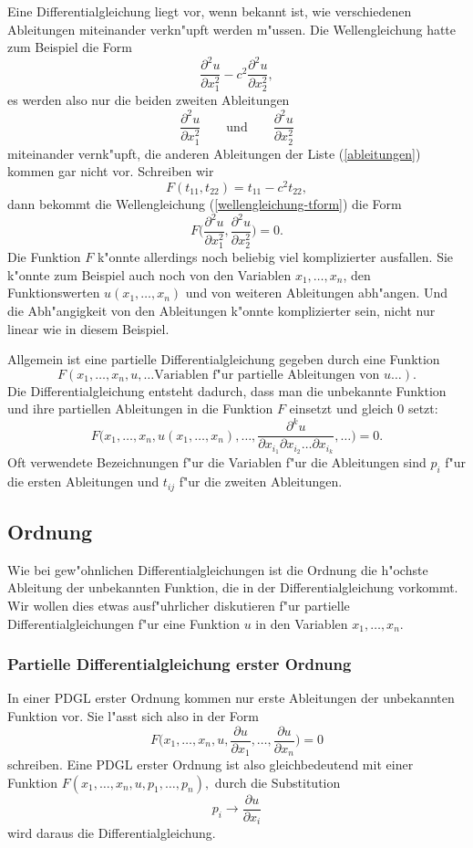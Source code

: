 Eine Differentialgleichung liegt vor, wenn bekannt ist, wie verschiedenen
Ableitungen miteinander verkn"upft werden m"ussen.
Die Wellengleichung hatte zum Beispiel die Form
\begin{equation}
\frac{\partial^2 u}{\partial x_1^2}
-
c^2\frac{\partial^2 u}{\partial x_2^2},
\label{wellengleichung-tform}
\end{equation}
es werden also nur die beiden zweiten Ableitungen
\[
\frac{\partial^2 u}{\partial x_1^2}
\qquad
\text{und}
\qquad
\frac{\partial^2 u}{\partial x_2^2}
\]
miteinander vernk"upft, die anderen Ableitungen der Liste
(\ref{ableitungen}) kommen gar nicht vor.
Schreiben wir
\[
F(t_{11}, t_{22}) = t_{11} -c^2t_{22},
\]
dann bekommt die Wellengleichung (\ref{wellengleichung-tform})
die Form
\[
F\biggl(
\frac{\partial^2 u}{\partial x_1^2},
\frac{\partial^2 u}{\partial x_2^2}
\biggr)=0.
\]
Die Funktion $F$ k"onnte allerdings noch beliebig viel komplizierter
ausfallen.
Sie k"onnte zum Beispiel auch noch von den Variablen $x_1,\dots,x_n$,
den Funktionswerten $u(x_1,\dots,x_n)$ und von weiteren Ableitungen
abh"angen.
Und die Abh"angigkeit von den Ableitungen k"onnte komplizierter sein,
nicht nur linear wie in diesem Beispiel.

Allgemein ist eine partielle Differentialgleichung gegeben
durch eine Funktion
\[
F(x_1,\dots,x_n,u,\dots\text{Variablen f"ur partielle Ableitungen von $u$}\dots).
\]
Die Differentialgleichung
entsteht dadurch, dass man die unbekannte Funktion
und ihre partiellen Ableitungen in die Funktion $F$ einsetzt und
gleich $0$ setzt:
\[
F\biggl(x_1,\dots,x_n,u(x_1,\dots,x_n),\dots,
\frac{\partial^k u}{\partial x_{i_1}\partial x_{i_2}\dots \partial x_{i_k}},\dots\biggr)=0.
\]
Oft verwendete Bezeichnungen f"ur die Variablen f"ur die Ableitungen sind
$p_i$ f"ur die ersten Ableitungen und $t_{ij}$ f"ur die zweiten Ableitungen.


\subsection{Ordnung\label{klassifikation:ordnung}}
Wie bei gew"ohnlichen Differentialgleichungen ist die Ordnung
die h"ochste Ableitung der unbekannten Funktion, die in der
Differentialgleichung vorkommt. Wir wollen dies etwas ausf"uhrlicher
diskutieren f"ur partielle Differentialgleichungen f"ur eine Funktion
$u$ in den Variablen $x_1,\dots,x_n$.

\subsubsection{Partielle Differentialgleichung erster Ordnung}
In einer PDGL erster Ordnung kommen nur erste Ableitungen der
unbekannten Funktion vor.
Sie l"asst sich also in der Form 
\[
F\biggl(x_1,\dots,x_n, u, \frac{\partial u}{\partial x_1},\dots,\frac{\partial u}{\partial x_n}\biggr)=0
\]
schreiben. Eine PDGL erster Ordnung ist also gleichbedeutend mit einer
Funktion 
$F(x_1,\dots,x_n,u,p_1,\dots,p_n),$
durch die Substitution
\[
p_i\to \frac{\partial u}{\partial x_i}
\]
wird daraus die Differentialgleichung.

